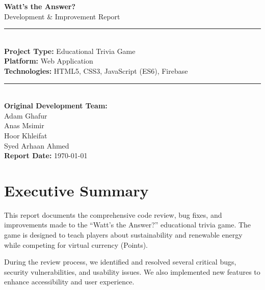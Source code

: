\documentclass[11pt,a4paper]{article}
\begin{document}
\begin{titlepage}
    \centering
    \vspace*{2cm}

    {\Huge\bfseries\textcolor{primaryorange}{Watt's the Answer?}\\[0.5cm]}
    {\Large\textcolor{secondaryblue}{Development \& Improvement Report}\\[2cm]}

    \rule{\textwidth}{1pt}\\[1cm]

    {\large
    \textbf{Project Type:} Educational Trivia Game\\[0.3cm]
    \textbf{Platform:} Web Application\\[0.3cm]
    \textbf{Technologies:} HTML5, CSS3, JavaScript (ES6), Firebase\\[0.3cm]
    }

    \rule{\textwidth}{1pt}\\[2cm]

    {\large\textbf{Original Development Team:}}\\[0.5cm]
    Adam Ghafur\\
    Anas Msimir\\
    Hoor Khleifat\\
    Syed Arhaan Ahmed\\[2cm]

    {\large\textbf{Report Date:} \today}

    \vfill
\end{titlepage}

\tableofcontents
\newpage

\section{Executive Summary}

This report documents the comprehensive code review, bug fixes, and improvements made to the ``Watt's the Answer?'' educational trivia game. The game is designed to teach players about sustainability and renewable energy while competing for virtual currency (Points).

During the review process, we identified and resolved several critical bugs, security vulnerabilities, and usability issues. We also implemented new features to enhance accessibility and user experience.
\end{document}
